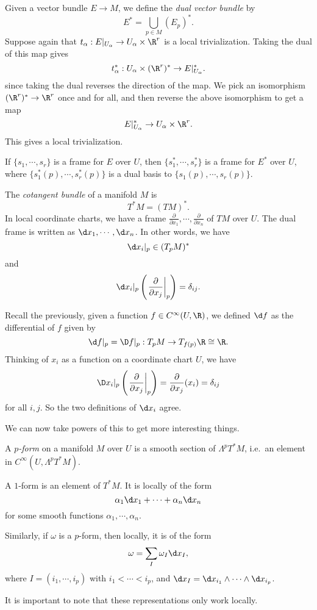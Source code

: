 \documentclass[a4paper]{article}
\begin{document}
\begin{defi}
  Given a vector bundle $E \to M$, we define the \emph{dual vector bundle} by
  \[
    E^* = \bigcup_{p \in M} (E_p)^*.
  \]
  Suppose again that $t_\alpha: E|_{U_\alpha} \to U_\alpha \times \R^r$ is a local trivialization. Taking the dual of this map gives
  \[
    t_\alpha^*: U_\alpha \times (\R^r)^* \to E|_{U_\alpha}^*.
  \]
  since taking the dual reverses the direction of the map. We pick an isomorphism $(\R^r)^* \to \R^r$ once and for all, and then reverse the above isomorphism to get a map
  \[
    E|_{U_\alpha}^* \to U_\alpha \times \R^r.
  \]
  This gives a local trivialization.
\end{defi}

If $\{s_1, \cdots, s_r\}$ is a frame for $E$ over $U$, then $\{s_1^*, \cdots, s_r^*\}$ is a frame for $E^*$ over $U$, where $\{s_1^{*}(p), \cdots, s_r^*(p)\}$ is a dual basis to $\{s_1(p), \cdots, s_r(p)\}$.

\begin{defi}
  The \emph{cotangent bundle} of a manifold $M$ is
  \[
    T^*M = (TM)^*.
  \]
  In local coordinate charts, we have a frame $\frac{\partial}{\partial x_1}, \cdots, \frac{\partial}{\partial x_n}$ of $TM$ over $U$. The dual frame is written as $\d x_1, \cdots, \d x_n$. In other words, we have
  \[
    \d x_i|_p \in (T_p M)^*
  \]
  and
  \[
    \d x_i|_p\left(\left.\frac{\partial}{\partial x_j}\right|_p\right) = \delta_{ij}.
  \]
\end{defi}

Recall the previously, given a function $f \in C^\infty(U, \R)$, we defined $\d f$ as the differential of $f$ given by
\[
  \d f|_p = \D f|_p: T_p M \to T_{f(p)} \R \cong \R.
\]
Thinking of $x_i$ as a function on a coordinate chart $U$, we have
\[
  \D x_i|_p \left(\left.\frac{\partial}{\partial x_j}\right|_p\right) = \frac{\partial}{\partial x_j}(x_i) = \delta_{ij}
\]
for all $i, j$. So the two definitions of $\d x_i$ agree.

We can now take powers of this to get more interesting things.
\begin{defi}[$p$-form]
  A \emph{$p$-form} on a manifold $M$ over $U$ is a smooth section of $\Lambda^p T^*M$, i.e.\ an element in $C^\infty (U, \Lambda^p T^*M)$.
\end{defi}

\begin{eg}
  A $1$-form is an element of $T^* M$. It is locally of the form
  \[
    \alpha_1 \d x_1 + \cdots + \alpha_n \d x_n
  \]
  for some smooth functions $\alpha_1, \cdots, \alpha_n$.

  Similarly, if $\omega$ is a $p$-form, then locally, it is of the form
  \[
    \omega = \sum_I \omega_I \d x_I,
  \]
  where $I = (i_1, \cdots, i_p)$ with $i_1 < \cdots < i_p$, and $\d x_I = \d x_{i_1} \wedge \cdots \wedge \d x_{i_p}$.
\end{eg}
It is important to note that these representations only work locally.
\end{document}
